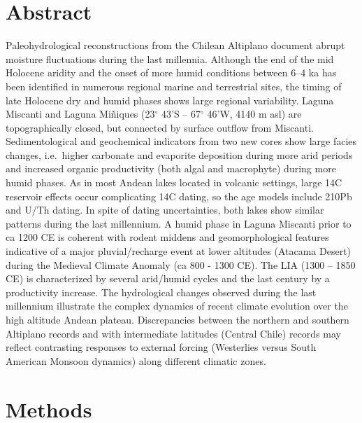 \documentclass[10pt,letterpaper]{article}
\begin{document}
\section*{Abstract}
Paleohydrological reconstructions from the Chilean Altiplano document abrupt moisture fluctuations during the last millennia. Although the end of the mid Holocene aridity and the onset of more humid conditions between 6--4 ka has been identified in numerous regional marine and terrestrial sites, the timing of late Holocene dry and humid phases shows large regional variability. Laguna Miscanti and Laguna Miñiques (23\(^\circ\) 43'S -- 67\(^\circ\) 46'W, 4140 m asl) are topographically closed, but connected by surface outflow from Miscanti. Sedimentological and geochemical indicators from two new cores show large facies changes, i.e.~higher carbonate and evaporite deposition during more arid periods and increased organic productivity (both algal and macrophyte) during more humid phases. As in most Andean lakes located in volcanic settings, large 14C reservoir effects occur complicating 14C dating, so the age models include 210Pb and U/Th dating. In spite of dating uncertainties, both lakes show similar patterns during the last millennium. A humid phase in Laguna Miscanti prior to ca 1200 CE is coherent with rodent middens and geomorphological features indicative of a major pluvial/recharge event at lower altitudes (Atacama Desert) during the Medieval Climate Anomaly (ca 800 - 1300 CE). The LIA (1300 -- 1850 CE) is characterized by several arid/humid cycles and the last century by a productivity increase. The hydrological changes observed during the last millennium illustrate the complex dynamics of recent climate evolution over the high altitude Andean plateau. Discrepancies between the northern and southern Altiplano records and with intermediate latitudes (Central Chile) records may reflect contrasting responses to external forcing (Westerlies versus South American Monsoon dynamics) along different climatic zones.


\linenumbers

\hypertarget{methods}{%
\section{Methods}\label{methods}}
\end{document}
